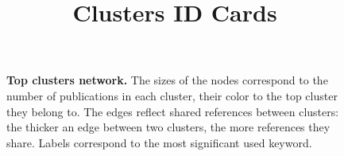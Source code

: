 \documentclass[a4paper,11pt]{report}
\title{{\bf Clusters ID Cards}}
\date{\begin{flushleft}This document gathers the ``ID Cards'' of the BC clusters found within the studied database.\\
 The BC network was built by linking pairs of publications based on the references they share - 9 out of 56 publications are in the network. The 4 clusters presented here correspond to the ones found in the top level grouping at least 1 publications. They gather a total of 9 publications. \\
 These ID cards displays the most frequent keywords, subject categories, journals of publication, institutions, countries, authors, references and reference journals of the publications of each cluster. The significance of an item $\sigma = \sqrt{N} (f - p) / \sqrt{p(1-p)}$ - where $N$ is the number of publications within the cluster and $f$ and $p$ are the proportion of publications respectively within the cluster and within the database displaying that item - is also given.\\
\vspace{1cm}
\copyright Sebastian Grauwin - BIBLIOTOOLS/BiblioTools3.2 (October 2017) \end{flushleft}}
\begin{document}
\begin{landscape}
\maketitle


\clearpage

\begin{figure}[h!]
\begin{center}
\caption{{\bf Top clusters network.} The sizes of the nodes correspond to the number of publications in each cluster, their color to the top cluster they belong to. The edges reflect shared references between clusters: the thicker an edge between two clusters, the more references they share. Labels correspond to the most significant used keyword. }
\end{center}
\end{figure}



\clearpage


\end{landscape}
\end{document}
